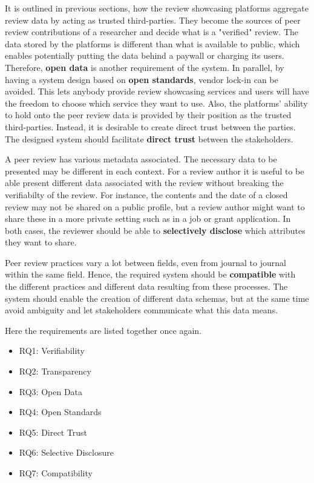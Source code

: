 It is outlined in previous sections, how the review showcasing platforms aggregate review data by acting as trusted third-parties. They become the sources of peer review contributions of a researcher and decide what is a "verified" review. The data stored by the platforms is different than what is available to public, which enables potentially putting the data behind a paywall or charging its users. Therefore, \textbf{open data} is another requirement of the system. In parallel, by having a system design based on \textbf{open standards}, vendor lock-in can be avoided. This lets anybody provide review showcasing services and users will have the freedom to choose which service they want to use. Also, the platforms' ability to hold onto the peer review data is provided by their position as the trusted third-parties.  Instead, it is desirable to create direct trust between the parties. The designed system should facilitate \textbf{direct trust} between the stakeholders. 

A peer review has various metadata associated. The necessary data to be presented may be different in each context. For a review author it is useful to be able present different data associated with the review without breaking the verifiabilty of the review. For instance, the contents and the date of a closed review may not be shared on a public profile, but a review author might want to share these in a more private setting such as in a job or grant application. In both cases, the reviewer should be able to \textbf{selectively disclose} which attributes they want to share.

Peer review practices vary a lot between fields, even from journal to journal within the same field. Hence, the required system should be \textbf{compatible} with the different practices and different data resulting from these processes. The system should enable the creation of different data schemas, but at the same time avoid ambiguity and let stakeholders communicate what this data means.

Here the requirements are listed together once again.
\begin{itemize}
  \item RQ1: Verifiability \label{rq:verifiable}
  \item RQ2: Transparency \label{rq:transparent}
  \item RQ3: Open Data \label{rq:open-data}
  \item RQ4: Open Standards \label{rq:open-standards}
  \item RQ5: Direct Trust \label{rq:direct-trust}
  \item RQ6: Selective Disclosure \label{rq:selective-disclosure}
  \item RQ7: Compatibility \label{rq:compatible}
\end{itemize}

